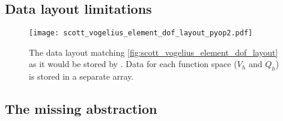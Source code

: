 \documentclass[thesis]{subfiles}
\begin{document}
\subsection{Data layout limitations}

\begin{figure}
  \centering
  \texttt{[image: scott\_vogelius\_element\_dof\_layout\_pyop2.pdf]}
  \caption{
    The data layout matching \cref{fig:scott_vogelius_element_dof_layout} as it would be stored by .
    Data for each function space ($V_h$ and $Q_h$) is stored in a separate array.
  }
  \label{fig:scott_vogelius_element_dof_layout_pyop2}
\end{figure}



\subsection{The missing abstraction}
\end{document}
